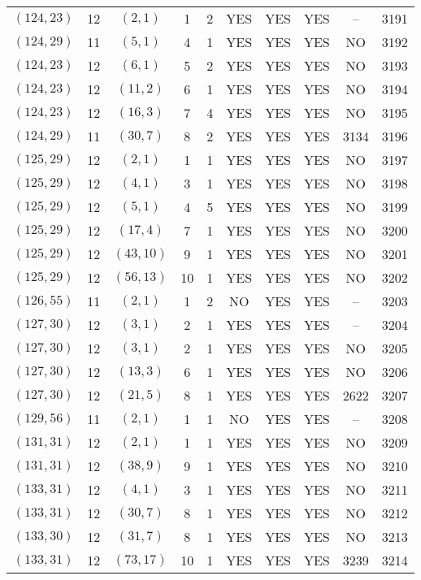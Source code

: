 \begin{longtable}{|c|c|c|c|c|c|c|c|c|c|}
$(124, 23)$ & 12 & $(2, 1)$ & 1 & 2 & YES & YES & YES & -- & 3191\\
$(124, 29)$ & 11 & $(5, 1)$ & 4 & 1 & YES & YES & YES & NO & 3192\\
$(124, 23)$ & 12 & $(6, 1)$ & 5 & 2 & YES & YES & YES & NO & 3193\\
$(124, 23)$ & 12 & $(11, 2)$ & 6 & 1 & YES & YES & YES & NO & 3194\\
$(124, 23)$ & 12 & $(16, 3)$ & 7 & 4 & YES & YES & YES & NO & 3195\\
$(124, 29)$ & 11 & $(30, 7)$ & 8 & 2 & YES & YES & YES & 3134 & 3196\\
$(125, 29)$ & 12 & $(2, 1)$ & 1 & 1 & YES & YES & YES & NO & 3197\\
$(125, 29)$ & 12 & $(4, 1)$ & 3 & 1 & YES & YES & YES & NO & 3198\\
$(125, 29)$ & 12 & $(5, 1)$ & 4 & 5 & YES & YES & YES & NO & 3199\\
$(125, 29)$ & 12 & $(17, 4)$ & 7 & 1 & YES & YES & YES & NO & 3200\\
$(125, 29)$ & 12 & $(43, 10)$ & 9 & 1 & YES & YES & YES & NO & 3201\\
$(125, 29)$ & 12 & $(56, 13)$ & 10 & 1 & YES & YES & YES & NO & 3202\\
$(126, 55)$ & 11 & $(2, 1)$ & 1 & 2 & NO & YES & YES & -- & 3203\\
$(127, 30)$ & 12 & $(3, 1)$ & 2 & 1 & YES & YES & YES & -- & 3204\\
$(127, 30)$ & 12 & $(3, 1)$ & 2 & 1 & YES & YES & YES & NO & 3205\\
$(127, 30)$ & 12 & $(13, 3)$ & 6 & 1 & YES & YES & YES & NO & 3206\\
$(127, 30)$ & 12 & $(21, 5)$ & 8 & 1 & YES & YES & YES & 2622 & 3207\\
$(129, 56)$ & 11 & $(2, 1)$ & 1 & 1 & NO & YES & YES & -- & 3208\\
$(131, 31)$ & 12 & $(2, 1)$ & 1 & 1 & YES & YES & YES & NO & 3209\\
$(131, 31)$ & 12 & $(38, 9)$ & 9 & 1 & YES & YES & YES & NO & 3210\\
$(133, 31)$ & 12 & $(4, 1)$ & 3 & 1 & YES & YES & YES & NO & 3211\\
$(133, 31)$ & 12 & $(30, 7)$ & 8 & 1 & YES & YES & YES & NO & 3212\\
$(133, 30)$ & 12 & $(31, 7)$ & 8 & 1 & YES & YES & YES & NO & 3213\\
$(133, 31)$ & 12 & $(73, 17)$ & 10 & 1 & YES & YES & YES & 3239 & 3214\\

\end{longtable}
